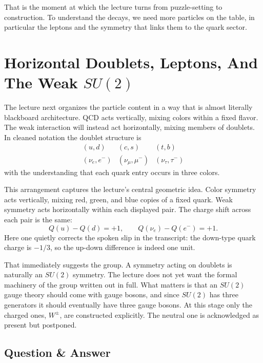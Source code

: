 That is the moment at which the lecture turns from puzzle-setting to construction. To understand the decays, we need more particles on the table, in particular the leptons and the symmetry that links them to the quark sector.

\section{Horizontal Doublets, Leptons, And The Weak \(SU(2)\)}

The lecture next organizes the particle content in a way that is almost literally blackboard architecture. QCD acts vertically, mixing colors within a fixed flavor. The weak interaction will instead act horizontally, mixing members of doublets. In cleaned notation the doublet structure is
\begin{equation}
\begin{array}{ccc}
(u,d) & (c,s) & (t,b)\\[6pt]
(\nu_e,e^-) & (\nu_\mu,\mu^-) & (\nu_\tau,\tau^-)
\end{array}
\end{equation}
with the understanding that each quark entry occurs in three colors.

This arrangement captures the lecture's central geometric idea. Color symmetry acts vertically, mixing red, green, and blue copies of a fixed quark. Weak symmetry acts horizontally within each displayed pair. The charge shift across each pair is the same:
\begin{equation}
Q(u)-Q(d)=+1,
\qquad
Q(\nu_e)-Q(e^-)=+1.
\end{equation}
Here one quietly corrects the spoken slip in the transcript: the down-type quark charge is \(-1/3\), so the up-down difference is indeed one unit.

That immediately suggests the group. A symmetry acting on doublets is naturally an \(SU(2)\) symmetry. The lecture does not yet want the formal machinery of the group written out in full. What matters is that an \(SU(2)\) gauge theory should come with gauge bosons, and since \(SU(2)\) has three generators it should eventually have three gauge bosons. At this stage only the charged ones, \(W^\pm\), are constructed explicitly. The neutral one is acknowledged as present but postponed.

\subsection{Question \& Answer}

